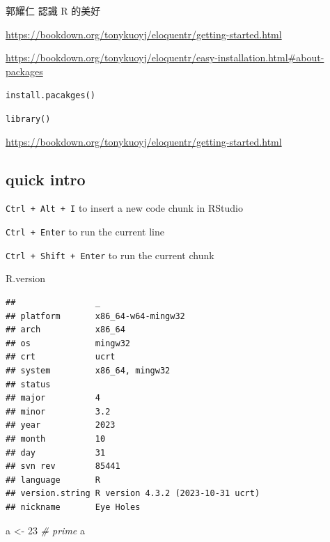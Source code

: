 \documentclass[
]{book}
\newenvironment{Shaded}{\begin{snugshade}}{\end{snugshade}}
\newcommand{\CommentTok}[1]{\textcolor[rgb]{0.56,0.35,0.01}{\textit{#1}}}
\newcommand{\DecValTok}[1]{\textcolor[rgb]{0.00,0.00,0.81}{#1}}
\newcommand{\NormalTok}[1]{#1}
\newcommand{\OtherTok}[1]{\textcolor[rgb]{0.56,0.35,0.01}{#1}}
\theoremstyle{definition}
\theoremstyle{definition}
\theoremstyle{definition}
\theoremstyle{definition}
\theoremstyle{remark}
\begin{document}
\begin{CJK}{UTF8}{bsmi}
郭耀仁 認識 R 的美好
\end{CJK}

\url{https://bookdown.org/tonykuoyj/eloquentr/getting-started.html}

\url{https://bookdown.org/tonykuoyj/eloquentr/easy-installation.html\#about-packages}

\texttt{install.pacakges()}

\texttt{library()}

\url{https://bookdown.org/tonykuoyj/eloquentr/getting-started.html}

\hypertarget{quick-intro}{%
\subsection{quick intro}\label{quick-intro}}

\texttt{Ctrl\ +\ Alt\ +\ I} to insert a new code chunk in RStudio

\texttt{Ctrl\ +\ Enter} to run the current line

\texttt{Ctrl\ +\ Shift\ +\ Enter} to run the current chunk

\begin{Shaded}
\begin{Highlighting}[]
\NormalTok{R.version}
\end{Highlighting}
\end{Shaded}

\begin{verbatim}
##                _                                
## platform       x86_64-w64-mingw32               
## arch           x86_64                           
## os             mingw32                          
## crt            ucrt                             
## system         x86_64, mingw32                  
## status                                          
## major          4                                
## minor          3.2                              
## year           2023                             
## month          10                               
## day            31                               
## svn rev        85441                            
## language       R                                
## version.string R version 4.3.2 (2023-10-31 ucrt)
## nickname       Eye Holes
\end{verbatim}

\begin{Shaded}
\begin{Highlighting}[]
\NormalTok{a }\OtherTok{\textless{}{-}} \DecValTok{23} \CommentTok{\# prime}
\NormalTok{a}
\end{Highlighting}
\end{Shaded}
\end{document}
